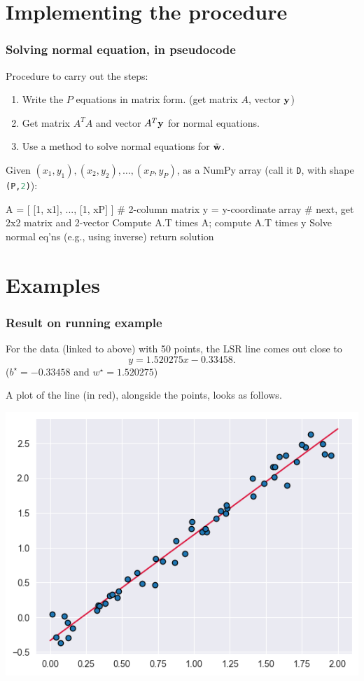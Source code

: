 \documentclass{beamer}
\theoremstyle{example}
\newcommand{\ct}[1]{\lstinline[language=Python,basicstyle=\ttfamily\footnotesize,stringstyle=\small\color{strings}]!#1!}
\begin{document}
\section{Implementing the procedure}

\begin{frame}[fragile]
\frametitle{Solving normal equation, in pseudocode}
Procedure to carry out the steps:
\begin{enumerate}
    \item Write the $P$ equations in matrix form. (get matrix $A$, vector ${\bf y}$)
    \item Get matrix $A^TA$ and vector $A^T{\bf y}$ for normal equations.
    \item Use a method to solve normal equations for $\tilde{\bf w}$.
\end{enumerate}

\pause
\vspace*{12pt}
Given $(x_1,y_1), (x_2,y_2), \ldots, (x_P, y_P)$, as a NumPy array (call it \ct{D}, with shape \ct{(P,2)}): 

\begin{pseudo}
A = [ [1, x1], ..., [1, xP] ] # 2-column matrix
y = y-coordinate array
# next, get 2x2 matrix and 2-vector
Compute A.T times A; compute A.T times y
Solve normal eq'ns (e.g., using inverse)
return solution 
\end{pseudo}

\end{frame}

\section{Examples}

\begin{frame}
\frametitle{Result on running example}
For the data (linked to above) with 50 points, the LSR line comes out close to
    \[y = 1.520275x - 0.33458.\]
($b^\star = -0.33458$ and $w^\star = 1.520275$)

\pause
A plot of the line (in red), alongside the points, looks as follows.

\vspace*{8pt}
\centering
\includegraphics[height=0.4\textheight]{example1-lsrline.png}
\end{frame}
\end{document}
